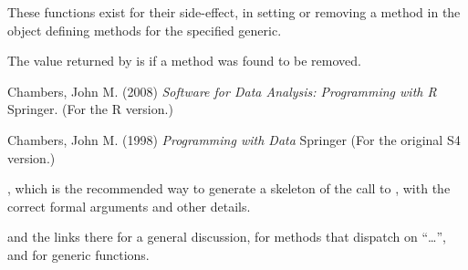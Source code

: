 %
\begin{Value}
These functions exist for their side-effect, in setting or removing a
method in the object defining methods for the specified generic.

The value returned by  is  if a method
was found to be removed.
\end{Value}
%
\begin{References}\relax
Chambers, John M. (2008)
\emph{Software for Data Analysis: Programming with R}
Springer.  (For the R version.)

Chambers, John M. (1998)
\emph{Programming with Data}
Springer (For the original S4 version.)
\end{References}
%
\begin{SeeAlso}\relax

, which is the recommended way to generate a skeleton of the call to , with the correct formal arguments and other details.

 and the links there for a general discussion,  for methods that dispatch on
``\dots'', and  for generic functions.
\end{SeeAlso}
%
